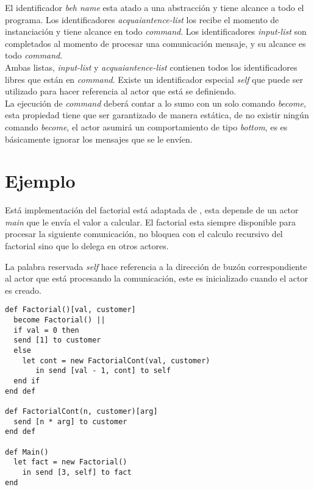 El identificador \textit{beh name} esta atado a una abstracción y tiene alcance
a todo el programa. Los identificadores \textit{acquaiantence-list} los recibe el
momento de instanciación y tiene alcance en todo \textit{command}. Los
identificadores \textit{input-list} son completados al momento de procesar una comunicación
mensaje, y su alcance es todo \textit{command}. \\
Ambas listas, \textit{input-list} y \textit{acquaiantence-list} contienen todos
los identificadores libres que están en \textit{command}. Existe un
identificador especial \textit{self} que puede ser utilizado para hacer
referencia al actor que está se definiendo. \\
La ejecución de \textit{command} deberá contar a lo sumo con un solo comando
\textit{become}, esta propiedad tiene que ser garantizado de manera estática, de no
existir ningún comando \textit{become}, el actor asumirá un comportamiento de
tipo \textit{bottom}, es es básicamente ignorar los mensajes que se le envíen.

\section{Ejemplo}

Está implementación del factorial está adaptada de \cite{Agha:1986:AMC:7929}, esta
depende de un actor \textit{main} que le envía el valor a calcular. El factorial
esta siempre disponible para procesar la siguiente comunicación, no bloquea con
el calculo recursivo del factorial sino que lo delega en otros actores.

La palabra reservada \textit{self} hace referencia a la dirección de buzón
correspondiente al actor que está procesando la comunicación, este es inicializado
cuando el actor es creado.

\begin{lstlisting}[language=sal, style=simple]
def Factorial()[val, customer]
  become Factorial() ||
  if val = 0 then
  send [1] to customer
  else
    let cont = new FactorialCont(val, customer)
       in send [val - 1, cont] to self
  end if 
end def

def FactorialCont(n, customer)[arg] 
  send [n * arg] to customer
end def

def Main() 
  let fact = new Factorial() 
    in send [3, self] to fact
end
\end{lstlisting}

